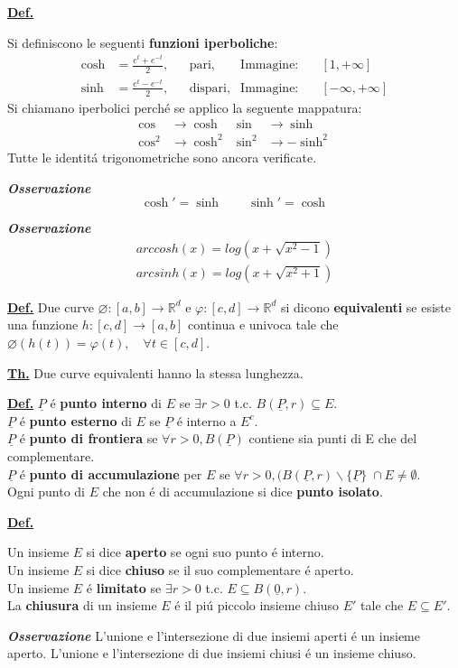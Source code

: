 \documentclass[a4paper,10pt]{article} %
\renewcommand{\b}[1]{%
    {\textbf{#1}}}
\renewcommand{\v}[1]{%
    {\underline{#1}}}
\newcommand{\ldef}[1]{%
    {\smallbreak\par\tiny\textbf{\underline{Def.}} {#1} \smallbreak}}
\newcommand{\ltheorem}[1]{%
    {\smallbreak\par\tiny\textbf{\underline{Th.}} {#1} \smallbreak\par}}
\newcommand{\loss}[1]{%
    {\smallbreak\par\tiny\emph{\textbf{Osservazione}} {#1} \par}}
\begin{document}
\begin{multicols}{6}
\ldef{
    Si definiscono le seguenti \b{funzioni iperboliche}:
    \begin{align*}
        \cosh &= \frac{e^t + e^{-t}}{2},&& \text{pari},& 
        \text{Immagine:}\quad& [1, +\infty]
       \\
        \sinh &= \frac{e^t - e^{-t}}{2},&& \text{dispari},& 
        \text{Immagine:}\quad& [-\infty,  +\infty]
    \end{align*}
    Si chiamano iperbolici perch\'{e} se applico la seguente mappatura:
    \begin{align*}
        \cos &\rightarrow \cosh
        &\sin &\rightarrow \sinh
        \\
        \cos^2 &\rightarrow \cosh^2
        &\sin^2 &\rightarrow -\sinh^2
    \end{align*}
    Tutte le identit\'{a} trigonometriche sono ancora verificate.
    \loss{
        \[
            \cosh' = \sinh \quad \quad \sinh' = \cosh
        \]
    }
    \vspace{-1em}
    \loss{
        \begin{gather*}
            arccosh(x) = log(x + \sqrt{x^2 - 1})
            \\
            arcsinh(x) = log(x + \sqrt{x^2 + 1})
        \end{gather*}
    }
}

\ldef{
    Due curve 
    $\varnothing \colon [a, b] \rightarrow \mathbb{R}^d $ e 
    $\varphi \colon [c, d] \rightarrow \mathbb{R}^d $
    si dicono \b{equivalenti} se esiste una funzione 
    $h \colon [c, d] \rightarrow [a, b]$
    continua e univoca tale che 
    $\varnothing(h(t)) = \varphi(t), \quad \forall t \in [c,d]$.
}

\ltheorem{
    Due curve equivalenti hanno la stessa lunghezza.
}


\ldef{
    $\v{P}$ é \b{punto interno} di $E$ se
    $\exists r > 0 $ t.c. $ B(\v{P}, r) \subseteq E$.\\
    $\v{P}$ é \b{punto esterno} di $E$ se $\v{P}$ é interno a $E^c$.\\
    $\v{P}$ é \b{punto di frontiera} se 
    $\forall r > 0, B(\v{P})$ contiene sia punti di E che del complementare.\\
    $\v{P}$ é \b{punto di accumulazione} per $E$ se 
    $\forall r > 0, (B(\v{P}, r) \backslash \{\v{P}\} \; \cap E \neq \emptyset  $.
    \\
    Ogni punto di $E$ che non é di accumulazione si dice \b{punto isolato}.
}

\ldef{
    Un insieme $E$ si dice \b{aperto} se ogni suo punto é interno.\\
    Un insieme $E$ si dice \b{chiuso} se il suo complementare é aperto.\\
    Un insieme $E$ é \b{limitato} se $\exists r > 0$ t.c. 
    $E \subseteq B(\v{0}, r)$.\\
    La \b{chiusura} di un insieme $E$ é il piú piccolo insieme chiuso 
    $E'$ tale che $E \subseteq E'$.
    \loss{
        L'unione e l'intersezione di due insiemi aperti é un insieme aperto.
        L'unione e l'intersezione di due insiemi chiusi é un insieme chiuso.
    }
}


\end{multicols}
\end{document}
